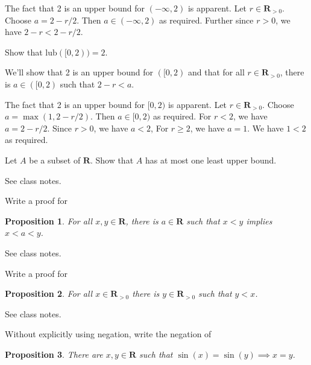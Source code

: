 \documentclass[12pt,fleqn,answers]{exam}
\newtheorem{prop}{Proposition}
\newcommand{\reals}{\mathbf{R}}
\newcommand{\lub}{\mathrm{lub}}
\begin{document}
\begin{questions}
\begin{solution}
The fact that 2 is an upper bound for $(-\infty, 2)$ is apparent.  Let $r \in \reals_{>0}$. Choose
$a = 2 - r/2$. Then $a \in (-\infty, 2)$ as required.  Further since $r >0$, we have $2 - r < 2 - r/2$.
\end{solution}


\question Show that $\lub([0, 2)) = 2$.

\begin{solution} We'll show that 2 is an upper bound for $([0, 2)$ and that for all $r \in \reals_{>0}$, 
there is $a \in ([0, 2)$ such that $2 - r < a$.

The fact that 2 is an upper bound for $[0, 2)$ is apparent.  Let $r \in \reals_{>0}$. Choose
$a = \max(1, 2- r/2)$. Then $a \in [0, 2)$ as required.  For $r < 2$, we have $a = 2 - r/2$.
Since $r > 0$, we have $a < 2$, For $r \geq 2$, we have $a=1$. We have $1 < 2$ as required.

\end{solution}
\question Let $A$ be a subset of $\reals$. Show that $A$ has at most one least upper bound.

\begin{solution}  See class notes.

\end{solution}

\question Write a proof for

\begin{prop}
  For all $x,y \in \reals$, there is $a \in \reals$ such that
    $x < y$ implies $x<a<y$. \label{p1}   
\end{prop}

\begin{solution}  See class notes.

\end{solution}

\question Write a proof for
    \begin{prop}   For all $x \in \reals_{>0}$ there is 
      $y \in \reals_{> 0}$ such that $y < x$.  \label{p5}
    \end{prop}
    
    \begin{solution}  See class notes.

\end{solution}
    
\question Without explicitly using negation, write the negation of 
        \begin{prop} There are $x,y \in \reals$ such that  $\sin(x) = \sin(y) \implies x = y$. 
     \end{prop} 
     

\end{questions}
\end{document}
